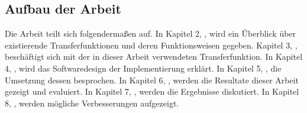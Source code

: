 \subsection{Aufbau der Arbeit}

Die Arbeit teilt sich folgendermaßen auf.
In Kapitel 2, , wird ein Überblick über existierende Transferfunktionen und deren Funktionsweisen gegeben.
Kapitel 3, , beschäftigt sich mit der in dieser Arbeit verwendeten Transferfunktion.
In Kapitel 4, , wird das Softwaredesign der Implementierung erklärt.
In Kapitel 5, , die Umsetzung dessen besprochen.
In Kapitel 6, , werden die Resultate dieser Arbeit gezeigt und evaluiert.
In Kapitel 7, , werden die Ergebnisse diskutiert.
In Kapitel 8, , werden mögliche Verbesserungen aufgezeigt.